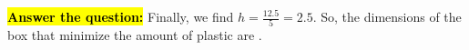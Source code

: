 \documentclass{article}
\newcommand{\highlight}[1]{\boldmath\hl{\textbf{#1}}\unboldmath}
\begin{document}
\begin{enumerate}
\begin{solution}
    \highlight{Answer the question:} Finally, we find $h=\frac{12.5}{5}=2.5$. So, the
    dimensions of the box that minimize the amount of plastic are 
    .
  \end{solution}



\end{enumerate}
\end{document}
